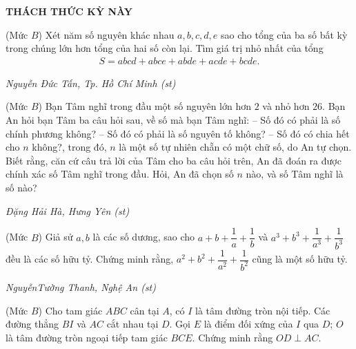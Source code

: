 \begin{center}
	\vspace*{-5pt}
	\textbf{\color{thachthuctoanhoc}\color{thachthuctoanhoc}\color{thachthuctoanhoc}THÁCH THỨC KỲ NÀY}
	\vspace*{-5pt}
\end{center}
\begin{multicols}{2}
	\setlength{\abovedisplayskip}{4pt}
	\setlength{\belowdisplayskip}{4pt}
	{}
	(Mức $B$) Xét năm số nguyên khác nhau $a,b,c,d,e$ sao cho tổng của ba số bất kỳ trong chúng lớn hơn tổng của hai số còn lại. Tìm giá trị nhỏ nhất của tổng 
	\begin{align*}
		S=abcd+abce+abde+acde+bcde.
	\end{align*}
	\begin{flushright}
		\textit{Nguyễn Đức Tấn, Tp. Hồ Chí Minh (st)}
	\end{flushright}
	{}
	(Mức $B$) Bạn Tâm nghĩ trong đầu một số nguyên lớn hơn $2$ và nhỏ hơn $26$. Bạn An hỏi bạn Tâm ba câu hỏi sau, về số mà bạn Tâm nghĩ:  
	\vskip 0.05cm
	-- Số đó có phải là số chính phương không?
	\vskip 0.05cm
	-- Số đó có phải là số nguyên tố không?
	\vskip 0.05cm
	-- Số đó có chia hết cho $n$ không?, 
	\vskip 0.05cm
	trong đó, $n$ là một số tự nhiên chẵn có một chữ số, do An tự chọn. 
	\vskip 0.05cm
	Biết rằng, căn cứ câu trả lời của Tâm cho ba câu hỏi trên, An đã đoán ra được chính xác số Tâm nghĩ trong đầu. Hỏi, An đã chọn số $n$ nào, và số Tâm nghĩ là số nào?
	\begin{flushright}
		\textit{Đặng Hải Hà, Hưng Yên (st)}
	\end{flushright}
	{}
	(Mức $B$) Giả sử $a,b$ là các số dương, sao cho $a+b+\dfrac1a+\dfrac1b$ và $a^3+b^3+\dfrac1{a^3}+\dfrac1{b^3}$ đều là các số hữu tỷ. Chứng minh rằng, $a^2+b^2+\dfrac1{a^2}+\dfrac1{b^2}$ cũng là một số hữu tỷ. 
	\begin{flushright}
		\textit{NguyễnTường Thanh, Nghệ An (st)}
	\end{flushright}
	{}
	(Mức $B$) Cho tam giác $ABC$ cân tại $A$, có $I$ là tâm đường tròn nội tiếp. Các đường thẳng $BI$ và $AC$ cắt nhau tại $D$. Gọi $E$ là điểm đối xứng của $I$ qua $D$; $O$ là tâm đường tròn ngoại tiếp tam giác $BCE$. Chứng minh rằng $OD\perp AC$. 
	\begin{figure}[H]
		\vspace*{-10pt}

\end{figure}
\end{multicols}
